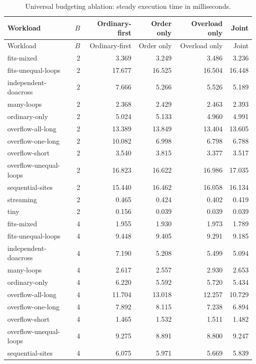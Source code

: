 \begin{center}
\small
\begin{longtable}{lrrrrr}
\caption{Universal budgeting ablation: steady execution time in milliseconds.}\label{tab:utb-ablation-detail}\\
\toprule
Workload & $B$ & Ordinary-first & Order only & Overload only & Joint \\
\midrule
\endfirsthead
\toprule
Workload & $B$ & Ordinary-first & Order only & Overload only & Joint \\
\midrule
\endhead
\bottomrule\endfoot
fits-mixed & 2 & 3.369 & 3.249 & 3.486 & 3.236 \\
fits-unequal-loops & 2 & 17.677 & 16.525 & 16.504 & 16.448 \\
independent-doacross & 2 & 7.666 & 5.266 & 5.526 & 5.189 \\
many-loops & 2 & 2.368 & 2.429 & 2.463 & 2.393 \\
ordinary-only & 2 & 5.024 & 5.133 & 4.960 & 4.991 \\
overflow-all-long & 2 & 13.389 & 13.849 & 13.404 & 13.605 \\
overflow-one-long & 2 & 10.082 & 6.998 & 6.798 & 6.788 \\
overflow-short & 2 & 3.540 & 3.815 & 3.377 & 3.517 \\
overflow-unequal-loops & 2 & 16.823 & 16.622 & 16.986 & 17.035 \\
sequential-sites & 2 & 15.440 & 16.462 & 16.058 & 16.134 \\
streaming & 2 & 0.465 & 0.424 & 0.402 & 0.419 \\
tiny & 2 & 0.156 & 0.039 & 0.039 & 0.039 \\
fits-mixed & 4 & 1.955 & 1.930 & 1.973 & 1.789 \\
fits-unequal-loops & 4 & 9.448 & 9.405 & 9.291 & 9.185 \\
independent-doacross & 4 & 7.190 & 5.208 & 5.499 & 5.094 \\
many-loops & 4 & 2.617 & 2.557 & 2.930 & 2.653 \\
ordinary-only & 4 & 6.220 & 5.592 & 5.720 & 5.434 \\
overflow-all-long & 4 & 11.704 & 13.018 & 12.257 & 10.729 \\
overflow-one-long & 4 & 7.892 & 8.115 & 7.238 & 6.894 \\
overflow-short & 4 & 1.465 & 1.532 & 1.511 & 1.482 \\
overflow-unequal-loops & 4 & 9.275 & 8.891 & 8.800 & 9.247 \\
sequential-sites & 4 & 6.075 & 5.971 & 5.669 & 5.839 \\

\end{longtable}
\end{center}
